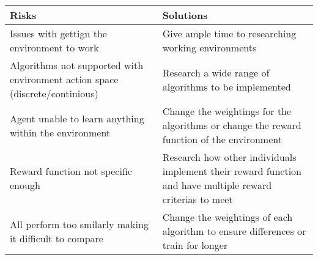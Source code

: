 \documentclass{surrey_disso_style}
\begin{document}
\renewcommand{\arraystretch}{1.5}
\setlength{\tabcolsep}{8pt}

\begin{center}
\begin{tabular}{|p{6.8cm}|p{6.8cm}|}
   \hline
   \textbf{Risks} & \textbf{Solutions}\\
   \hline
   Issues with gettign the environment to work  & Give ample time to researching working environments\\
   \hline
   Algorithms not supported with environment action space (discrete/continious)  & Research a wide range of algorithms to be implemented\\
   \hline
   Agent unable to learn anything within the environment  & Change the weightings for the algorithms or change the reward function of the environment\\
   \hline
   Reward function not specific enough   & Research how other individuals implement their reward function and have multiple reward criterias to meet\\
   \hline
   All perform too smilarly making it difficult to compare  & Change the weightings of each algorithm to ensure differences or train for longer\\
   \hline


\end{tabular}
\end{center}


\renewcommand{\arraystretch}{1.5}
\setlength{\tabcolsep}{8pt}
\end{document}
